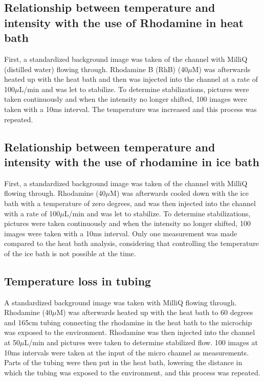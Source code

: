 \documentclass[twoside,twocolumn,9pt,a4paper]{IEEEtran}
\begin{document}
\subsection{Relationship between temperature and intensity with the use of Rhodamine in heat bath}

First, a standardized background image was taken of the channel with MilliQ (distilled water) flowing through. Rhodamine B (RhB)  (40$\mu$M) was afterwards heated up with the heat bath and then was injected into the channel at a rate of 100$\mu$L/min and was let to stabilize. To determine stabilizations, pictures were taken continuously and when the intensity no longer shifted, 100 images were taken with a 10ms interval. The temperature was increased and this process was repeated.

\subsection{Relationship between temperature and intensity with the use of rhodamine in ice bath}

First, a standardized background image was taken of the channel with MilliQ flowing through. Rhodamine (40$\mu$M) was afterwards cooled down with the ice bath with a temperature of zero degrees, and was then injected into the channel with a rate of 100$\mu$L/min and was let to stabilize. To determine stabilizations, pictures were taken continuously and when the intensity no longer shifted, 100 images were taken with a 10ms interval. Only one measurement was made compared to the heat bath analysis, considering that controlling the temperature of the ice bath is not possible at the time.

\subsection{Temperature loss in tubing}

A standardized background image was taken with MilliQ flowing through. Rhodamine (40$\mu$M) was afterwards heated up with the heat bath to 60 degrees and 165cm tubing connecting the rhodamine in the heat bath to the microchip was exposed to the environment. Rhodamine was then injected into the channel at 50$\mu$L/min and pictures were taken to determine stabilized flow. 100 images at 10ms intervals were taken at the input of the micro channel as measurements. Parts of the tubing were then put in the heat bath, lowering the distance in which the tubing was exposed to the environment, and this process was repeated.
\end{document}
